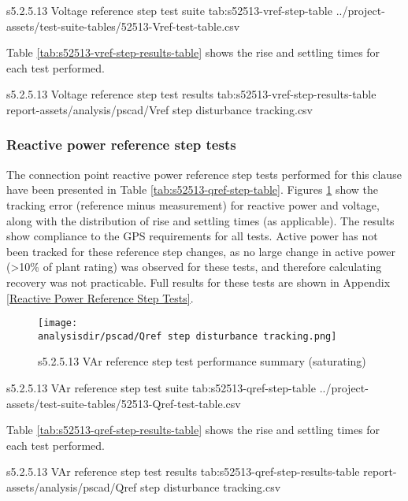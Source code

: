 \documentclass{../grid-link-report}
\newcommand{\projectassetsdir}{../project-assets}
\newcommand{\analysisdir}{report-assets/analysis}
\begin{document}
	
	{
		\fontsize{9}{10}\selectfont
		\autoscaledlongtable
		{s5.2.5.13 Voltage reference step test suite}
		{tab:s52513-vref-step-table}
		{\projectassetsdir/test-suite-tables/52513-Vref-test-table.csv}
	}
	
	Table \ref{tab:s52513-vref-step-results-table} shows the rise and settling times for each test performed.
	
	{
		\fontsize{9}{10}\selectfont
		\autoscaledlongtable
		{s5.2.5.13 Voltage reference step test results}
		{tab:s52513-vref-step-results-table}
		{report-assets/analysis/pscad/Vref step disturbance tracking.csv}
	}
	
	\subsubsection{Reactive power reference step tests}
	
	The connection point reactive power reference step tests performed for this clause have been presented in Table \ref{tab:s52513-qref-step-table}. Figures \ref{fig:s52513-qref-step-summary-plot} show the tracking error (reference minus measurement) for reactive power and voltage, along with the distribution of rise and settling times (as applicable). The results show compliance to the GPS requirements for all tests. Active power has not been tracked for these reference step changes, as no large change in active power (>10\% of plant rating) was observed for these tests, and therefore calculating recovery was not practicable. Full results for these tests are shown in Appendix \ref{Reactive Power Reference Step Tests}.
	
	
	\begin{figure}[H]
		\centering
		\texttt{[image: \\analysisdir/pscad/Qref step disturbance tracking.png]}
		\caption{s5.2.5.13 VAr reference step test performance summary (saturating)}
		\label{fig:s52513-qref-step-summary-plot}
	\end{figure}
	
	{
		\autoscaledlongtable
		{s5.2.5.13 VAr reference step test suite}
		{tab:s52513-qref-step-table}
		{\projectassetsdir/test-suite-tables/52513-Qref-test-table.csv}
	}
	
	Table \ref{tab:s52513-qref-step-results-table} shows the rise and settling times for each test performed.
	
	{
		\fontsize{9}{10}\selectfont
		\autoscaledlongtable
		{s5.2.5.13 VAr reference step test results}
		{tab:s52513-qref-step-results-table}
		{report-assets/analysis/pscad/Qref step disturbance tracking.csv}
	}
	
\end{document}
